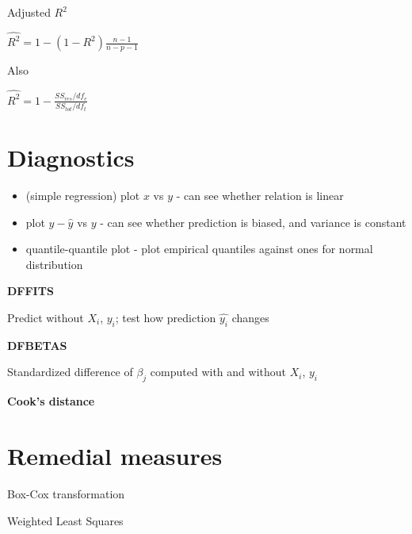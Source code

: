 \documentclass{article}
\begin{document}
Adjusted $R^2$

$\hat{R^2} = 1 - (1-R^2) \frac{n-1}{n-p-1}$

Also

$\hat{R^2} = 1 - \frac{SS_{res}/df_e}{SS_{tot}/df_t}$

\section{Diagnostics}

\begin{itemize}
    \item (simple regression) plot $x$ vs $y$ - can see whether relation is linear
    \item plot $y - \hat{y}$ vs $y$ - can see whether prediction is biased, and variance is constant
    \item quantile-quantile plot - plot empirical quantiles against ones for normal distribution
\end{itemize}

\textbf{DFFITS}

Predict without $X_i$, $y_i$; test how prediction $\hat{y_i}$ changes

\textbf{DFBETAS}

Standardized difference of $\beta_j$ computed with and without $X_i$, $y_i$

\textbf{Cook's distance}

\section{Remedial measures}

Box-Cox transformation

Weighted Least Squares
\end{document}
